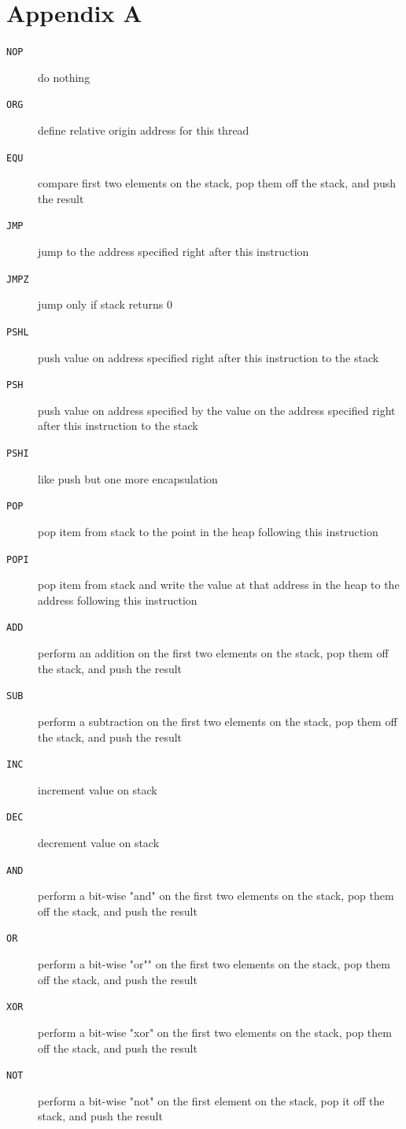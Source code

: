 \documentclass[letterpaper, 12pt]{article}
\begin{document}
\section{Appendix A}
\label{sec:appendix_a}
\begin{description}
\item[\texttt{NOP}] do nothing
\item[\texttt{ORG}] define relative origin address for this thread
\item[\texttt{EQU}] compare first two elements on the stack, pop them off the stack, and push the result
\item[\texttt{JMP}] jump to the address specified right after this instruction
\item[\texttt{JMPZ}] jump only if stack returns 0
\item[\texttt{PSHL}] push value on address specified right after this instruction to the stack
\item[\texttt{PSH}] push value on address specified by the value on the address specified right after this instruction to the stack
\item[\texttt{PSHI}] like push but one more encapsulation
\item[\texttt{POP}] pop item from stack to the point in the heap following this instruction
\item[\texttt{POPI}] pop item from stack and write the value at that address in the heap to the address following this instruction
\item[\texttt{ADD}] perform an addition on the first two elements on the stack, pop them off the stack, and push the result
\item[\texttt{SUB}] perform a subtraction on the first two elements on the stack, pop them off the stack, and push the result
\item[\texttt{INC}] increment value on stack
\item[\texttt{DEC}] decrement value on stack
\item[\texttt{AND}] perform a bit-wise "and" on the first two elements on the stack, pop them off the stack, and push the result
\item[\texttt{OR}] perform a bit-wise "or"" on the first two elements on the stack, pop them off the stack, and push the result
\item[\texttt{XOR}] perform a bit-wise "xor" on the first two elements on the stack, pop them off the stack, and push the result
\item[\texttt{NOT}] perform a bit-wise "not" on the first element on the stack, pop it off the stack, and push the result

\end{description}
\end{document}
